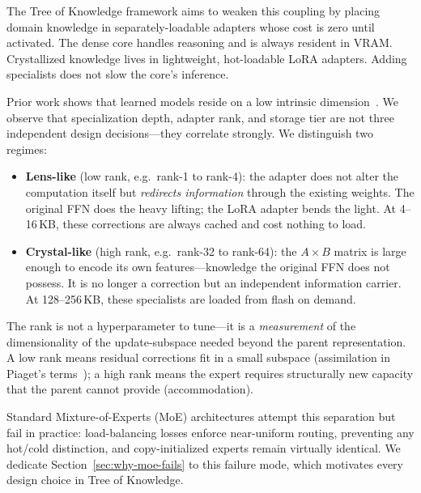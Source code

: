 \documentclass{article}
\newcommand{\tok}{Tree of Knowledge}
\begin{document}
The \tok{} framework aims to weaken this coupling by placing domain knowledge in separately-loadable adapters whose cost is zero until activated. The dense core handles reasoning and is always resident in VRAM. Crystallized knowledge lives in lightweight, hot-loadable LoRA adapters. Adding specialists does not slow the core's inference.

Prior work shows that learned models reside on a low intrinsic
dimension~\cite{li2018intrinsic,aghajanyan2021intrinsic}. We observe that
specialization depth, adapter rank, and storage tier are not three independent
design decisions---they correlate strongly. We distinguish two regimes:

\begin{itemize}[nosep,leftmargin=1em]
\item \textbf{Lens-like} (low rank, e.g.\ rank-1 to rank-4): the adapter does not alter the computation itself but \emph{redirects information} through the existing weights. The original FFN does the heavy lifting; the LoRA adapter bends the light. At 4--16\,KB, these corrections are always cached and cost nothing to load.
\item \textbf{Crystal-like} (high rank, e.g.\ rank-32 to rank-64): the $A \times B$ matrix is large enough to encode its own features---knowledge the original FFN does not possess. It is no longer a correction but an independent information carrier. At 128--256\,KB, these specialists are loaded from flash on demand.
\end{itemize}

The rank is not a hyperparameter to tune---it is a \emph{measurement} of the
dimensionality of the update-subspace needed beyond the parent representation.
A low rank means residual corrections fit in a small subspace (assimilation in
Piaget's terms~\cite{piaget1952}); a high rank means the expert requires
structurally new capacity that the parent cannot provide (accommodation).



Standard Mixture-of-Experts (MoE) architectures attempt this separation but
fail in practice: load-balancing losses enforce near-uniform routing, preventing
any hot/cold distinction, and copy-initialized experts remain virtually
identical. We dedicate Section~\ref{sec:why-moe-fails} to this failure mode,
which motivates every design choice in \tok{}.
\end{document}
